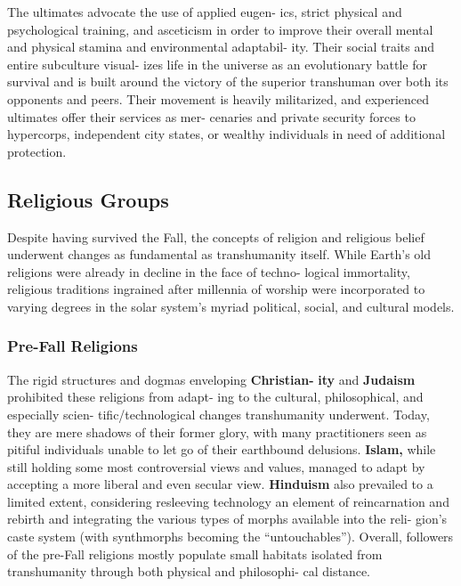 The ultimates advocate the use of applied eugen-
ics, strict physical and psychological training, and 
asceticism in order to improve their overall mental 
and physical stamina and environmental adaptabil-
ity. Their social traits and entire subculture visual-
izes life in the universe as an evolutionary battle 
for survival and is built around the victory of the 
superior transhuman over both its opponents and 
peers. Their movement is heavily militarized, and 
experienced ultimates offer their services as mer-
cenaries and private security forces to hypercorps, 
independent city states, or wealthy individuals in 
need of additional protection.

\subsection{Religious Groups}

Despite having survived the Fall, the concepts of 
religion and religious belief underwent changes as 
fundamental as transhumanity itself. While Earth's old 
religions were already in decline in the face of techno-
logical immortality, religious traditions ingrained after 
millennia of worship were incorporated to varying 
degrees in the solar system's myriad political, social, 
and cultural models.

\subsubsection{Pre-Fall Religions}

The rigid structures and dogmas enveloping \textbf{Christian-}
\textbf{ity} and \textbf{Judaism} prohibited these religions from adapt-
ing to the cultural, philosophical, and especially scien-
tific/technological changes transhumanity underwent. 
Today, they are mere shadows of their former glory, 
with many practitioners seen as pitiful individuals 
unable to let go of their earthbound delusions. \textbf{Islam,}
while still holding some most controversial views and 
values, managed to adapt by accepting a more liberal 
and even secular view. \textbf{Hinduism} also prevailed to a 
limited extent, considering resleeving technology an 
element of reincarnation and rebirth and integrating 
the various types of morphs available into the reli-
gion's caste system (with synthmorphs becoming the 
``untouchables''). Overall, followers of the pre-Fall 
religions mostly populate small habitats isolated from 
transhumanity through both physical and philosophi-
cal distance.

